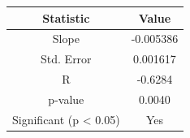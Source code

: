 \begin{center}
\begin{tabular}{cc}
\toprule
  \textbf{Statistic}   & \textbf{Value}  \\
\midrule
        Slope          &   -0.005386     \\
      Std. Error       &    0.001617     \\
          R            &    -0.6284      \\
       p-value         &     0.0040      \\
Significant (p < 0.05) &      Yes        \\
\bottomrule
\end{tabular}
\end{center}